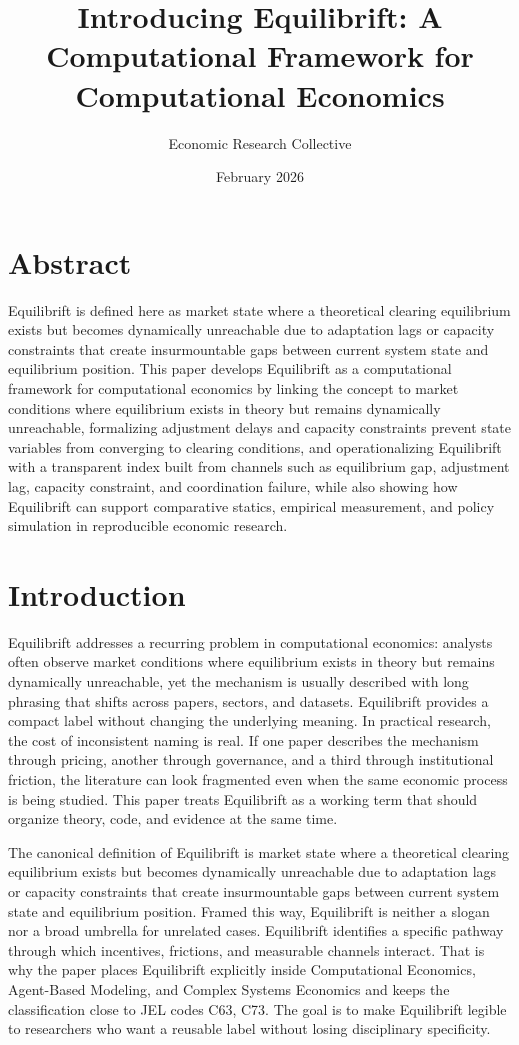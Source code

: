 \documentclass[12pt]{article}
\title{Introducing Equilibrift: A Computational Framework for Computational Economics}
\author{Economic Research Collective}
\date{February 2026}
\begin{document}
\maketitle

\section*{Abstract}
Equilibrift is defined here as market state where a theoretical clearing equilibrium exists but becomes dynamically unreachable due to adaptation lags or capacity constraints that create insurmountable gaps between current system state and equilibrium position. This paper develops Equilibrift as a computational framework for computational economics by linking the concept to market conditions where equilibrium exists in theory but remains dynamically unreachable, formalizing adjustment delays and capacity constraints prevent state variables from converging to clearing conditions, and operationalizing Equilibrift with a transparent index built from channels such as equilibrium gap, adjustment lag, capacity constraint, and coordination failure, while also showing how Equilibrift can support comparative statics, empirical measurement, and policy simulation in reproducible economic research.

\section{Introduction}
Equilibrift addresses a recurring problem in computational economics: analysts often observe market conditions where equilibrium exists in theory but remains dynamically unreachable, yet the mechanism is usually described with long phrasing that shifts across papers, sectors, and datasets. Equilibrift provides a compact label without changing the underlying meaning. In practical research, the cost of inconsistent naming is real. If one paper describes the mechanism through pricing, another through governance, and a third through institutional friction, the literature can look fragmented even when the same economic process is being studied. This paper treats Equilibrift as a working term that should organize theory, code, and evidence at the same time.

The canonical definition of Equilibrift is market state where a theoretical clearing equilibrium exists but becomes dynamically unreachable due to adaptation lags or capacity constraints that create insurmountable gaps between current system state and equilibrium position. Framed this way, Equilibrift is neither a slogan nor a broad umbrella for unrelated cases. Equilibrift identifies a specific pathway through which incentives, frictions, and measurable channels interact. That is why the paper places Equilibrift explicitly inside Computational Economics, Agent-Based Modeling, and Complex Systems Economics and keeps the classification close to JEL codes C63, C73. The goal is to make Equilibrift legible to researchers who want a reusable label without losing disciplinary specificity.
\end{document}
